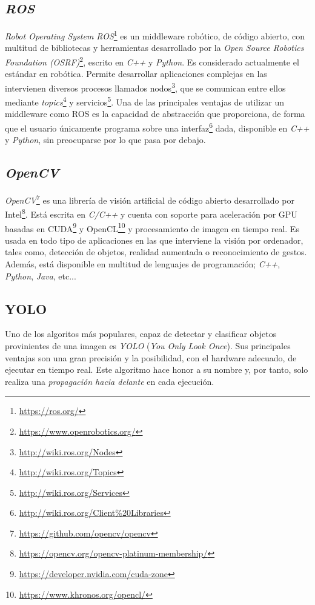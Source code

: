 \subsection{\textit{ROS}}
\label{subsection:ros}
\textit{Robot Operating System ROS}\footnote{\url{https://ros.org/}} es un middleware robótico, de código abierto, con multitud de bibliotecas y herramientas desarrollado por la \textit{Open Source Robotics Foundation (OSRF)}\footnote{\url{https://www.openrobotics.org/}}, escrito en \textit{C++} y \textit{Python}. Es considerado actualmente el estándar en robótica. Permite desarrollar aplicaciones complejas en las intervienen diversos procesos llamados nodos\footnote{\url{http://wiki.ros.org/Nodes}}, que se comunican entre ellos mediante \textit{topics}\footnote{\url{http://wiki.ros.org/Topics}} y servicios\footnote{\url{http://wiki.ros.org/Services}}. Una de las principales ventajas de utilizar un middleware como ROS es la capacidad de abstracción que proporciona, de forma que el usuario únicamente programa sobre una interfaz\footnote{\url{http://wiki.ros.org/Client\%20Libraries}} dada, disponible en \textit{C++} y \textit{Python}, sin preocuparse por lo que pasa por debajo.\\

\subsection{\textit{OpenCV}}
\label{subsection:opencv}
\textit{OpenCV}\footnote{\url{https://github.com/opencv/opencv}} es una librería de visión artificial de código abierto desarrollado por Intel\footnote{\url{https://opencv.org/opencv-platinum-membership/}}. Está escrita en \textit{C/C++} y cuenta con soporte para aceleración por GPU basadas en CUDA\footnote{\url{https://developer.nvidia.com/cuda-zone}} y OpenCL\footnote{\url{https://www.khronos.org/opencl/}} y procesamiento de imagen en tiempo real. Es usada en todo tipo de aplicaciones en las que interviene la visión por ordenador, tales como, detección de objetos, realidad aumentada o reconocimiento de gestos. Además, está disponible en multitud de lenguajes de programación; \textit{C++}, \textit{Python}, \textit{Java}, etc...\\

\subsection{YOLO}
\label{sec:yolo}

Uno de los algoritos más populares, capaz de detectar y clasificar objetos provinientes de una imagen es \textit{YOLO} (\textit{You Only Look Once})\cite{yolov3}. Sus principales ventajas son una gran precisión y la posibilidad, con el hardware adecuado, de ejecutar en tiempo real. Este algoritmo hace honor a su nombre y, por tanto, solo realiza una \textit{propagación hacia delante} en cada ejecución.\\

